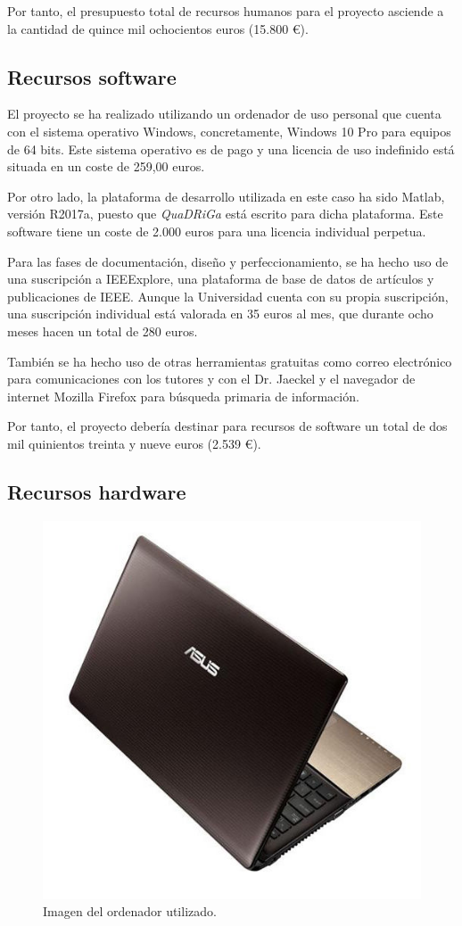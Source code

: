 Por tanto, el presupuesto total de recursos humanos para el proyecto asciende a la cantidad de quince mil ochocientos euros (15.800 \euro).

\subsection{Recursos software}

El proyecto se ha realizado utilizando un ordenador de uso personal que cuenta con el sistema operativo Windows, concretamente, Windows 10 Pro para equipos de 64 bits. Este sistema operativo es de pago y una licencia de uso indefinido está situada en un coste de 259,00 euros.

Por otro lado, la plataforma de desarrollo utilizada en este caso ha sido Matlab, versión R2017a, puesto que \textit{QuaDRiGa} está escrito para dicha plataforma. Este software tiene un coste de 2.000 euros para una licencia individual perpetua.

Para las fases de documentación, diseño y perfeccionamiento, se ha hecho uso de una suscripción a IEEExplore, una plataforma de base de datos de artículos y publicaciones de IEEE. Aunque la Universidad cuenta con su propia suscripción, una suscripción individual está valorada en 35 euros al mes, que durante ocho meses hacen un total de 280 euros.

También se ha hecho uso de otras herramientas gratuitas como correo electrónico para comunicaciones con los tutores y con el Dr. Jaeckel y el navegador de internet Mozilla Firefox para búsqueda primaria de información.

Por tanto, el proyecto debería destinar para recursos de software un total de dos mil quinientos treinta y nueve euros (2.539 \euro).

\subsection{Recursos hardware}

\begin{figure}[h!]
	\centering
    \includegraphics[width=0.7\linewidth]{imagenes/ordenador.jpg}
	\caption{Imagen del ordenador utilizado.}
	\label{fig:ordenador}
\end{figure}

